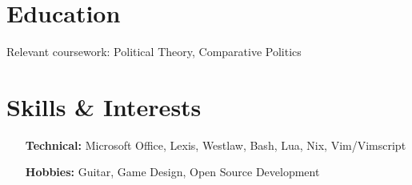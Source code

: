 \documentclass[letterpaper]{resume-shreeram}
\begin{document}
\section{Education}

\begin{compactitem}
  \item Relevant coursework: Political Theory, Comparative Politics
\end{compactitem}



\section{Skills \& Interests}

\begin{itemize}
  \item[\bfseries Technical:] Microsoft Office, Lexis, Westlaw, Bash,
    Lua, Nix, Vim/Vimscript

  \item[\bfseries Hobbies:] Guitar, Game Design, Open Source Development

\end{itemize}
\end{document}
